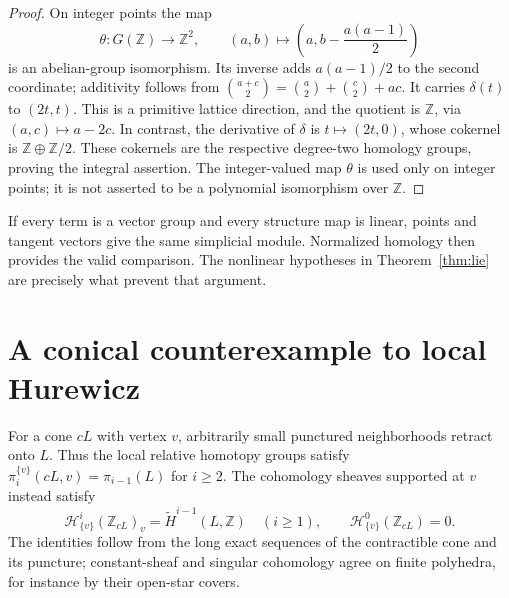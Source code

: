 \documentclass[11pt,a4paper]{article}
\theoremstyle{definition}
\newcommand{\Z}{\mathbb Z}
\begin{document}
\begin{proof}
On integer points the map
\[
 \theta:G(\Z)\longrightarrow\Z^2,\qquad
 (a,b)\longmapsto\left(a,b-\frac{a(a-1)}2\right)
\]
is an abelian-group isomorphism. Its inverse adds $a(a-1)/2$ to the second coordinate; additivity follows from
$\binom{a+c}{2}=\binom a2+\binom c2+ac$.
It carries $\delta(t)$ to $(2t,t)$. This is a primitive lattice direction, and the quotient is $\Z$, via $(a,c)\mapsto a-2c$. In contrast, the derivative of $\delta$ is $t\mapsto(2t,0)$, whose cokernel is $\Z\oplus\Z/2$. These cokernels are the respective degree-two homology groups, proving the integral assertion. The integer-valued map $\theta$ is used only on integer points; it is not asserted to be a polynomial isomorphism over $\Z$.
\end{proof}

If every term is a vector group and every structure map is linear, points and tangent vectors give the same simplicial module. Normalized homology then provides the valid comparison. The nonlinear hypotheses in Theorem~\ref{thm:lie} are precisely what prevent that argument.

\section{A conical counterexample to local Hurewicz}\label{sec:hurewicz}
For a cone $cL$ with vertex $v$, arbitrarily small punctured neighborhoods retract onto $L$. Thus the local relative homotopy groups satisfy
$\pi_i^{\{v\}}(cL,v)=\pi_{i-1}(L)$ for $i\ge2$.
The cohomology sheaves supported at $v$ instead satisfy
\begin{equation}\label{eq:cone-cohom}
 \mathcal H^i_{\{v\}}(\Z_{cL})_v
  =\widetilde H^{i-1}(L,\Z)\quad(i\ge1),
 \qquad \mathcal H^0_{\{v\}}(\Z_{cL})=0.
\end{equation}
The identities follow from the long exact sequences of the contractible cone and its puncture; constant-sheaf and singular cohomology agree on finite polyhedra, for instance by their open-star covers.
\end{document}
